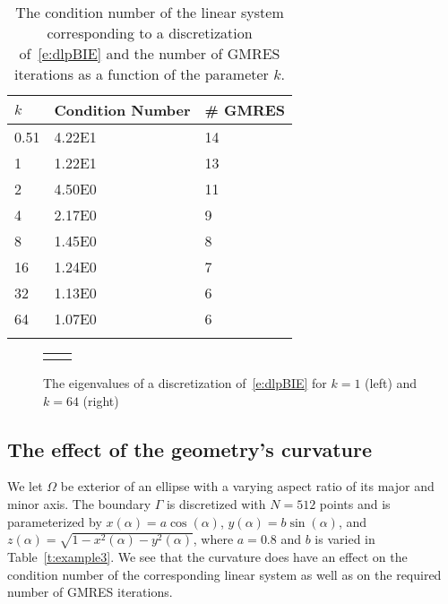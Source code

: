 \begin{table}[htps]
\caption{\label{t:example2} The condition number of the linear system
corresponding to a discretization of~\eqref{e:dlpBIE} and the number of
GMRES iterations as a function of the parameter $k$.}
\centering
\begin{tabular*}{0.8\textwidth}{@{\extracolsep{\fill}}lll}
$k$ & Condition Number & \# GMRES \\
\hline\noalign{\smallskip}
0.51 & 4.22E1 & 14 \\
1    & 1.22E1 & 13 \\
2    & 4.50E0 & 11 \\
4    & 2.17E0 & 9  \\
8    & 1.45E0 & 8  \\  
16   & 1.24E0 & 7  \\ 
32   & 1.13E0 & 6  \\
64   & 1.07E0 & 6  \\
\noalign{\smallskip}\hline
\end{tabular*}
\end{table}

\begin{figure}[htps]
\centering
\begin{tabular}{cc}
 &

\end{tabular}
\caption{\label{f:evalues} The eigenvalues of a discretization
of~\eqref{e:dlpBIE} for $k=1$ (left) and $k=64$ (right)}
\end{figure}


\subsection{The effect of the geometry's curvature}
We let $\Omega$ be exterior of an ellipse with a varying aspect ratio
of its major and minor axis.  The boundary $\Gamma$ is discretized with
$N=512$ points and is parameterized by $x(\alpha) = a\cos(\alpha)$,
$y(\alpha) = b\sin(\alpha)$, and $z(\alpha) =
\sqrt{1-x^{2}(\alpha)-y^{2}(\alpha)}$, where $a = 0.8$ and $b$ is
varied in Table~\ref{t:example3}.  We see that the curvature does have
an effect on the condition number of the corresponding linear system as
well as on the required number of GMRES iterations.

